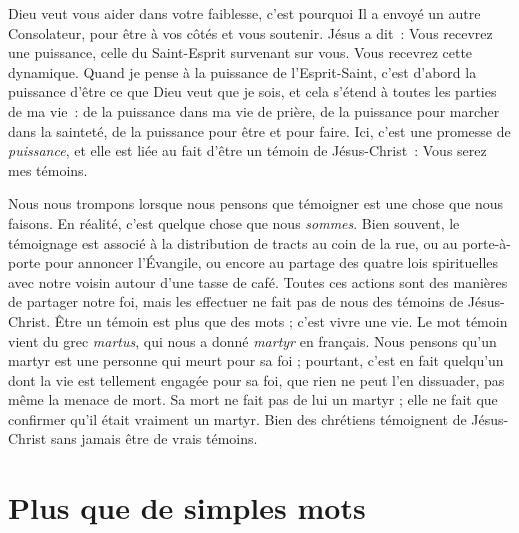 Dieu veut vous aider dans votre faiblesse,
 c'est pourquoi Il a envoyé un autre Consolateur,
 pour être à vos côtés et vous soutenir. Jésus a dit~:
 \og Vous recevrez une puissance,
 celle du Saint-Esprit survenant sur vous. \fg{}
 Vous recevrez cette dynamique. Quand je pense à la puissance
 de l'Esprit-Saint, c'est d'abord la puissance d'être ce que Dieu
 veut que je sois, et cela s'étend à toutes les parties de ma vie~:
 de la puissance dans ma vie de prière, de la puissance pour marcher
 dans la sainteté, de la puissance pour être et pour faire.
 Ici, c'est une promesse de \emph{puissance}, et elle est liée au fait
 d'être un témoin de Jésus-Christ~: \og Vous serez mes témoins. \fg{}

Nous nous trompons lorsque nous pensons que témoigner
 est une chose que nous faisons.
 En réalité, c'est quelque chose que nous \emph{som\-mes}.
 Bien souvent, le témoignage est associé à la distribution de tracts
 au coin de la rue, ou au porte-à-porte pour annoncer l'Évangile,
 ou encore au partage des quatre lois spirituelles avec notre voisin
 autour d'une tasse de café.
 Toutes ces actions sont des manières de partager notre foi,
 mais les effectuer ne fait pas de nous des témoins de Jésus-Christ.
 Être un témoin est plus que des mots ; c'est vivre une vie.
 Le mot \og témoin \fg{} vient du grec \emph{martus},
 qui nous a donné \emph{martyr} en français.
 Nous pensons qu'un martyr est une personne qui meurt pour sa foi ;
 pourtant, c'est en fait quelqu'un dont la vie est tellement engagée
 pour sa foi, que rien ne peut l'en dissuader, pas même la menace de mort.
 Sa mort ne fait pas de lui un martyr ; elle ne fait que confirmer
 qu'il était vraiment un martyr.
 Bien des chrétiens témoignent de Jésus-Christ
 sans jamais être de vrais témoins.

\section{Plus que de simples mots}

